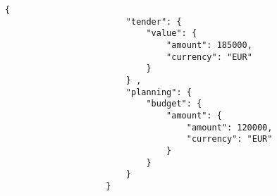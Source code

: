 \begin{itemize}
                \begin{lstlisting}[language=lJSON]
                    {
                        "tender": {
                            "value": {
                                "amount": 185000,
                                "currency": "EUR"
                            }
                        } ,
                        "planning": {
                            "budget": {
                                "amount": {
                                    "amount": 120000,
                                    "currency": "EUR"
                                }
                            }
                        }
                    }
                \end{lstlisting}
        \end{itemize}
        

